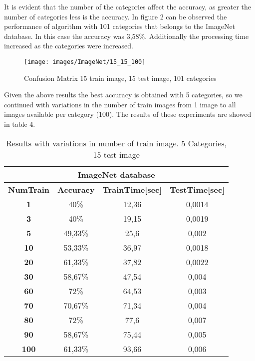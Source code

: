 \documentclass[10pt,twocolumn,letterpaper]{article}
\begin{document}
It is evident that the number of the categories affect the accuracy, as greater the number of categories less is the accuracy. In figure 2 can be observed the performance of algorithm with 101 categories that belongs to the ImageNet database. In this case the accuracy was 3,58\%. Additionally the processing time increased as the categories were increased. 

\begin{figure}[H]  \texttt{[image: images/ImageNet/15\_15\_100]}\caption{Confusion Matrix 15 train image, 15 test image, 101 categories}\label{Comp}\end{figure}

Given the above results the best accuracy is obtained with 5 categories, so we continued with variations in the number of train images from 1 image to all images available per category (100). The results of these experiments are showed in table 4. 

\begin{table}[H]
\centering
\caption{Results with variations in number of train image. 5 Categories, 15 test image}
\label{my-label}
\begin{tabular}{|c|c|c|c|}
\hline
\multicolumn{4}{|c|}{\textbf{ImageNet database}} \\ \hline
\multicolumn{1}{|l|}{\textbf{NumTrain}} & \multicolumn{1}{l|}{\textbf{Accuracy}} & \multicolumn{1}{l|}{\textbf{TrainTime{[}sec{]}}} & \multicolumn{1}{l|}{\textbf{TestTime{[}sec{]}}} \\ \hline
\textbf{1} & 40\% & 12,36 & 0,0014 \\ \hline
\textbf{3} & 40\% & 19,15 & 0,0019 \\ \hline
\textbf{5} & 49,33\% & 25,6 & 0,002 \\ \hline
\textbf{10} & 53,33\% & 36,97 & 0,0018 \\ \hline
\textbf{20} & 61,33\% & 37,82 & 0,0022 \\ \hline
\textbf{30} & 58,67\% & 47,54 & 0,004 \\ \hline
\textbf{60} & 72\% & 64,53 & 0,003 \\ \hline
\textbf{70} & 70,67\% & 71,34 & 0,004 \\ \hline
\textbf{80} & 72\% & 77,6 & 0,007 \\ \hline
\textbf{90} & 58,67\% & 75,44 & 0,005 \\ \hline
\textbf{100} & 61,33\% & 93,66 & 0,006 \\ \hline
\end{tabular}
\end{table}
\end{document}
